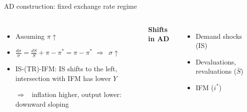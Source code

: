 \documentclass{beamer}
\newcommand{\tb}[1]{{\color{blue}{\textbf{#1}}}}
\newcommand{\tr}[1]{{\color{red}{\textbf{#1}}}}
\newenvironment{mytemize}
{\vfill\itemize[nolistsep,itemsep=\fill,label=\color{blue}{$\triangleright$}]}
  {\enditemize}
\newcommand{\rarr}{$\Rightarrow$\ }
\begin{document}
\begin{frame}{AD construction: fixed exchange rate regime}
\begin{columns}
\begin{itemize}
\item Assuming $\pi\uparrow$
\item $\frac{d \sigma}{\sigma} = \frac{d S}{S} + \pi  - \pi^* = \pi - \pi^*$ \rarr $\sigma\uparrow$
\item IS-(TR)-IFM: IS shifts to the left, intersection with IFM has lower $Y$
\item[\rarr] inflation higher, output lower: downward sloping \tb{AD}
\end{itemize}
\textbf{Shifts in AD}
\begin{itemize}
  \item Demand shocks (IS)
  \item Devaluations, revaluations ($\bar S$)
  \item IFM ($i^*$) 
\end{itemize}

%
	
\end{columns} 	 
\end{frame}


%
% 
%
\end{document}
